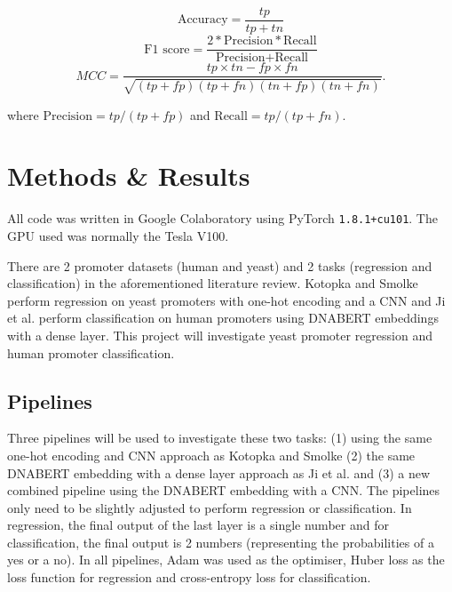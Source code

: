 \documentclass{article}
\begin{document}
$$
\textrm{Accuracy} = \frac{tp}{tp+tn} 
$$
$$
\textrm{F1 score} = \frac{2*\textrm{Precision}*\textrm{Recall}}{\textrm{Precision}+\textrm{Recall}}$$
$$
MCC = \frac{tp \times tn - fp \times fn}{\sqrt{(tp + fp)(tp + fn)(tn + fp)(tn + fn)}}.
$$

where $\textrm{Precision} = {tp}/({tp+fp})$ and $\textrm{Recall} = {tp}/({tp+fn})$.

\section{Methods \& Results}
All code was written in Google Colaboratory using PyTorch \texttt{1.8.1+cu101}. The GPU used was normally the Tesla V100.

There are 2 promoter datasets (human and yeast) and 2 tasks (regression and classification) in the aforementioned literature review. Kotopka and Smolke \cite{smolke2020promoter} perform regression on yeast promoters with one-hot encoding and a CNN and Ji et al. \cite{dnabert2020} perform classification on human promoters using DNABERT embeddings with a dense layer. This project will investigate yeast promoter regression and human promoter classification. 

\subsection{Pipelines}
Three pipelines will be used to investigate these two tasks: (1) using the same one-hot encoding and CNN approach as Kotopka and Smolke \cite{smolke2020promoter} (2) the same DNABERT embedding with a dense layer approach as Ji et al. \cite{dnabert2020} and (3) a new combined pipeline using the DNABERT embedding with a CNN. The pipelines only need to be slightly adjusted to perform regression or classification. In regression, the final output of the last layer is a single number and for classification, the final output is 2 numbers (representing the probabilities of a yes or a no). In all pipelines, Adam was used as the optimiser, Huber loss as the loss function for regression and cross-entropy loss for classification. 
\end{document}
